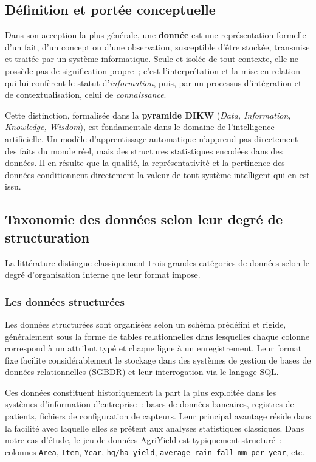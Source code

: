 \subsection{Définition et portée conceptuelle}

Dans son acception la plus générale, une \textbf{donnée} est une représentation formelle d'un fait, d'un concept ou d'une observation, susceptible d'être stockée, transmise et traitée par un système informatique. Seule et isolée de tout contexte, elle ne possède pas de signification propre~; c'est l'interprétation et la mise en relation qui lui confèrent le statut d'\textit{information}, puis, par un processus d'intégration et de contextualisation, celui de \textit{connaissance}.

Cette distinction, formalisée dans la \textbf{pyramide DIKW} (\textit{Data, Information, Knowledge, Wisdom}), est fondamentale dans le domaine de l'intelligence artificielle. Un modèle d'apprentissage automatique n'apprend pas directement des faits du monde réel, mais des structures statistiques encodées dans des données. Il en résulte que la qualité, la représentativité et la pertinence des données conditionnent directement la valeur de tout système intelligent qui en est issu.

\subsection{Taxonomie des données selon leur degré de structuration}

La littérature distingue classiquement trois grandes catégories de données selon le degré d'organisation interne que leur format impose.

\subsubsection{Les données structurées}

Les données structurées sont organisées selon un schéma prédéfini et rigide, généralement sous la forme de tables relationnelles dans lesquelles chaque colonne correspond à un attribut typé et chaque ligne à un enregistrement. Leur format fixe facilite considérablement le stockage dans des systèmes de gestion de bases de données relationnelles (SGBDR) et leur interrogation via le langage SQL.

Ces données constituent historiquement la part la plus exploitée dans les systèmes d'information d'entreprise~: bases de données bancaires, registres de patients, fichiers de configuration de capteurs. Leur principal avantage réside dans la facilité avec laquelle elles se prêtent aux analyses statistiques classiques. Dans notre cas d'étude, le jeu de données AgriYield est typiquement structuré~: colonnes \texttt{Area}, \texttt{Item}, \texttt{Year}, \texttt{hg/ha\_yield}, \texttt{average\_rain\_fall\_mm\_per\_year}, etc.

